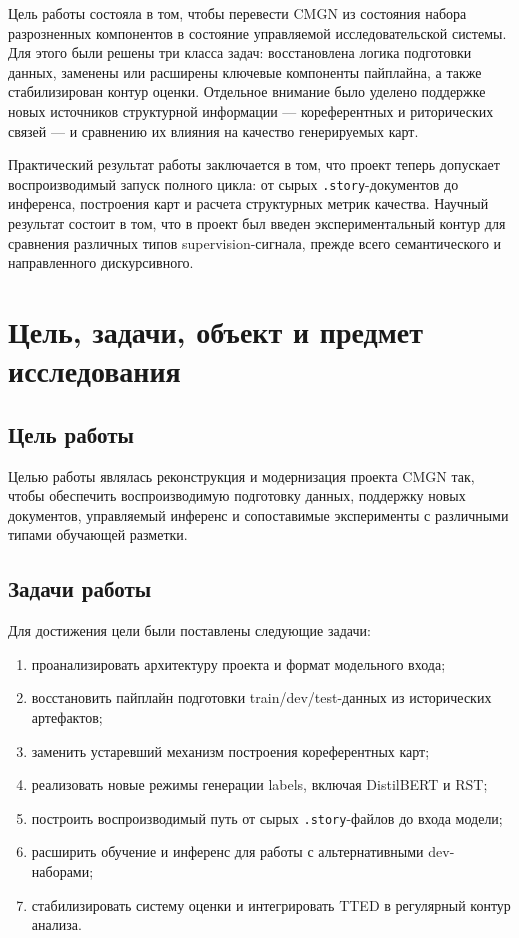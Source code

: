 \documentclass[12pt,a4paper]{article}
\begin{document}
Цель работы состояла в том, чтобы перевести CMGN из состояния набора разрозненных компонентов в состояние управляемой исследовательской системы. Для этого были решены три класса задач: восстановлена логика подготовки данных, заменены или расширены ключевые компоненты пайплайна, а также стабилизирован контур оценки. Отдельное внимание было уделено поддержке новых источников структурной информации --- кореферентных и риторических связей --- и сравнению их влияния на качество генерируемых карт.

Практический результат работы заключается в том, что проект теперь допускает воспроизводимый запуск полного цикла: от сырых \texttt{.story}-документов до инференса, построения карт и расчета структурных метрик качества. Научный результат состоит в том, что в проект был введен экспериментальный контур для сравнения различных типов supervision-сигнала, прежде всего семантического и направленного дискурсивного.

\section{Цель, задачи, объект и предмет исследования}

\subsection{Цель работы}

Целью работы являлась реконструкция и модернизация проекта CMGN так, чтобы обеспечить воспроизводимую подготовку данных, поддержку новых документов, управляемый инференс и сопоставимые эксперименты с различными типами обучающей разметки.

\subsection{Задачи работы}

Для достижения цели были поставлены следующие задачи:

\begin{enumerate}
    \item проанализировать архитектуру проекта и формат модельного входа;
    \item восстановить пайплайн подготовки train/dev/test-данных из исторических артефактов;
    \item заменить устаревший механизм построения кореферентных карт;
    \item реализовать новые режимы генерации labels, включая DistilBERT и RST;
    \item построить воспроизводимый путь от сырых \texttt{.story}-файлов до входа модели;
    \item расширить обучение и инференс для работы с альтернативными dev-наборами;
    \item стабилизировать систему оценки и интегрировать TTED в регулярный контур анализа.
\end{enumerate}
\end{document}
